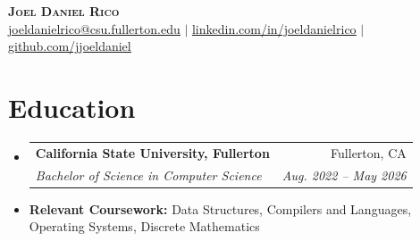 \documentclass[letterpaper,11pt]{article}
\makeatletter
\newcommand{\resumeItem}[1]{
  \item\small{
    {#1 \vspace{-2pt}}
  }
}
\newcommand{\resumeSubheading}[4]{
  \vspace{-2pt}\item
    \begin{tabular*}{0.97\textwidth}[t]{l@{\extracolsep{\fill}}r}
      \textbf{#1} & #2 \\
      \textit{\small#3} & \textit{\small #4} \\
    \end{tabular*}\vspace{-7pt}
}
\newcommand{\resumeSubHeadingListStart}{\begin{itemize}[leftmargin=0.15in, label={}]}
\newcommand{\resumeSubHeadingListEnd}{\end{itemize}}
\makeatother
\begin{document}
\begin{center}
    \textbf{\Huge \scshape Joel Daniel Rico} \\ \vspace{1pt}
    \small \href{mailto:joeldanielrico@csu.fullerton.edu.com}{\underline{joeldanielrico@csu.fullerton.edu}} $|$
    \href{https://linkedin.com/in/joeldanielrico}{\underline{linkedin.com/in/joeldanielrico}} $|$
    \href{https://github.com/jjoeldaniel}{\underline{github.com/jjoeldaniel }}
\end{center}

\section{Education}
  \resumeSubHeadingListStart
    \resumeSubheading
      {California State University, Fullerton}{Fullerton, CA}
      {Bachelor of Science in Computer Science}{Aug. 2022 -- May 2026}
    \resumeItem{\textbf{Relevant Coursework: }Data Structures, Compilers and Languages, Operating Systems, Discrete Mathematics}
  \resumeSubHeadingListEnd

\end{document}
